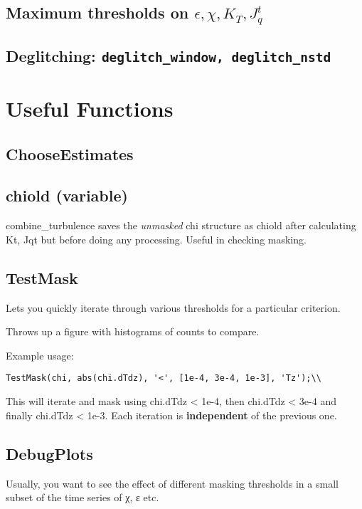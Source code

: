 \subsection{Maximum thresholds on $\epsilon, \chi, K_T, J_q^t$}

\subsection{Deglitching: \texttt{deglitch\_window, deglitch\_nstd
}}

\section{Useful Functions}
\subsection{ChooseEstimates}
\subsection{chiold (variable)}
combine\_turbulence saves the \emph{unmasked} chi structure as chiold after calculating Kt, Jqt but before doing any processing. Useful in checking masking.

\subsection{TestMask}
Lets you quickly iterate through various thresholds for a particular criterion.

Throws up a figure with histograms of counts to compare.

Example usage:
\begin{lstlisting}
TestMask(chi, abs(chi.dTdz), '<', [1e-4, 3e-4, 1e-3], 'Tz');\\
\end{lstlisting}

This will iterate and mask using chi.dTdz < 1e-4, then chi.dTdz < 3e-4 and finally chi.dTdz < 1e-3. Each iteration is \textbf{independent} of the previous one.

\subsection{DebugPlots}
Usually, you want to see the effect of different masking thresholds in a small subset of the time series of χ, ε etc.

